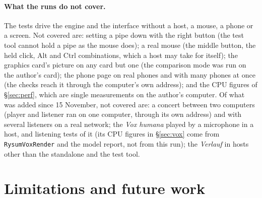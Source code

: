 \documentclass[11pt,a4paper,parskip=half,DIV=11,toc=bibliography]{scrartcl}
\newcommand{\ui}[1]{\emph{#1}}                 %
\newcommand{\fn}[1]{\mbox{\texttt{#1}}}
\begin{document}
\paragraph{What the runs do not cover.} The tests drive the engine and the interface without a host, a mouse, a phone or a screen. Not covered are:
setting a pipe down with the right button (the test tool cannot hold a pipe as the mouse does); a real mouse (the middle button, the held click,
Alt and Ctrl combinations, which a host may take for itself); the graphics card's picture on any card but one (the comparison mode was run on the
author's card); the phone page on real phones and with many phones at once (the checks reach it through the computer's own address); and the CPU figures of \S\ref{sec:perf},
which are single measurements on the author's computer. Of what was added since 15 November, not covered are: a concert between two computers
(player and listener ran on one computer, through its own address) and with several listeners on a real network; the \ui{Vox humana} played by a
microphone in a host, and listening tests of it (its CPU figures in \S\ref{sec:vox} come from \fn{RysumVoxRender} and the model report, not from this
run); the \ui{Verlauf} in hosts other than the standalone and the test tool.

\section{Limitations and future work}
\label{sec:future}
\end{document}

